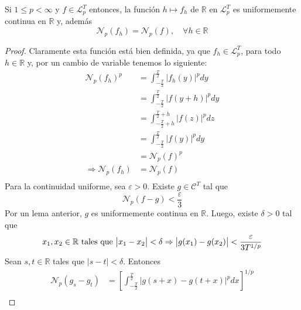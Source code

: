 \documentclass[12pt]{report}
\theoremstyle{largebreak}
\newcommand\abs[1]{\ensuremath{\big|#1\big|}}
\newcommand{\N}[2]{\ensuremath{\mathcal{N}_{#1}\left(#2\right)}}
\begin{document}
    \begin{propo}
        Si $1\leq p<\infty$ y $f\in\mathcal{L}_p^T$ entonces, la función $h\mapsto f_h$ de $\mathbb{R}$ en $\mathcal{L}_p^T$ es uniformemente continua en $\mathbb{R}$ y, además
        \begin{equation*}
            \N{p}{f_h}=\N{p}{f},\quad\forall h\in\mathbb{R}
        \end{equation*}
    \end{propo}

    \begin{proof}
        Claramente esta función está bien definida, ya que $f_h\in\mathcal{L}_p^T$, para todo $h\in\mathbb{R}$ y, por un cambio de variable tenemos lo siguiente:
        \begin{equation*}
            \begin{split}
                \N{p}{f_h}^p&=\int_{-\frac{T}{2}}^{\frac{T}{2}}\abs{f_h(y)}^pdy\\
                &=\int_{-\frac{T}{2}}^{\frac{T}{2}}\abs{f(y+h)}^pdy\\
                &=\int_{-\frac{T}{2}+h}^{\frac{T}{2}+h}\abs{f(z)}^pdz\\
                &=\int_{-\frac{T}{2}}^{\frac{T}{2}}\abs{f(y)}^pdy\\
                &=\N{p}{f}^p\\
                \Rightarrow \N{p}{f_h}&=\N{p}{f}\\
            \end{split}
        \end{equation*}
        Para la continuidad uniforme, sea $\varepsilon>0$. Existe $g\in\mathcal{C}^T$ tal que
        \begin{equation*}
            \N{p}{f-g}<\frac{\varepsilon}{3}
        \end{equation*}
        Por un lema anterior, $g$ es uniformemente continua en $\mathbb{R}$. Luego, existe $\delta>0$ tal que
        \begin{equation*}
            x_1,x_2\in\mathbb{R}\textup{ tales que }\abs{x_1-x_2}<\delta\Rightarrow\abs{g(x_1)-g(x_2)}<\frac{\varepsilon}{3T^{1/p}}
        \end{equation*}
        Sean $s,t\in\mathbb{R}$ tales que $\abs{s-t}<\delta$. Entonces
        \begin{equation*}
            \begin{split}
                \N{p}{g_s-g_t}&=\left[\int_{-\frac{T}{2}}^{\frac{T}{2}}\abs{g(s+x)-g(t+x)}^pdx \right]^{1/p}\\

\end{split}
\end{equation*}
\end{proof}
\end{document}
